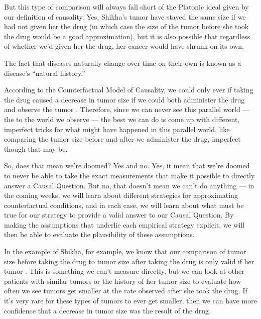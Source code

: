 \documentclass[letterpaper,10pt,english]{jupyterBook}
\begin{document}
\sphinxAtStartPar
But this type of comparison will always fall short of the Platonic ideal given by our definition of causality. Yes, Shikha’s tumor  have stayed the same size if we had not given her the drug (in which case the size of the tumor before she took the drug would be a good approximation), but it is also possible that regardless of whether we’d given her the drug, her cancer would have shrunk on its own.%
\begin{footnote}[1]\sphinxAtStartFootnote
The fact that diseases naturally change over time on their own is known as a disease’s “natural history.”
%
\end{footnote}

\sphinxAtStartPar
According to the Counterfactual Model of Causality, we could only ever  if taking the drug caused a decrease in tumor size if we could both administer the drug and observe the tumor . Therefore, since we can never see this parallel world — the  to the world we observe — the best we can do is come up with different, imperfect tricks for  what might have happened in this parallel world, like comparing the tumor size before and after we administer the drug, imperfect though that may be.

\sphinxAtStartPar
So, does that mean we’re doomed? Yes and no. Yes, it  mean that we’re doomed to never be able to take the exact measurements that make it possible to directly answer a Causal Question. But no, that doesn’t mean we can’t do anything — in the coming weeks, we will learn about different strategies for approximating counterfactual conditions, and in each case, we will learn about what  must be true for our strategy to provide a valid answer to our Causal Question. By making the assumptions that underlie each empirical strategy explicit, we will then be able to evaluate the plausibility of these assumptions.

\sphinxAtStartPar
In the example of Shikha, for example, we know that our comparison of tumor size before taking the drug to tumor size after taking the drug is only valid if her tumor . This is something we can’t measure directly, but we can look at other patients with similar tumors or the history of her tumor size to evaluate how often we see tumors get smaller at the rate observed after she took the drug. If it’s very rare for these types of tumors to ever get smaller, then we can have more confidence that a decrease in tumor size was the result of the drug.
\end{document}
